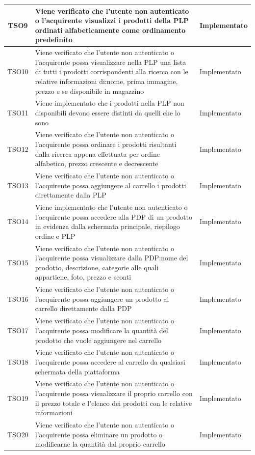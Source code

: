 \begin{longtable}{|c| C{10cm} |C{3cm}|}
	TSO9 & Viene verificato che l'utente non autenticato o l'acquirente visualizzi i prodotti della PLP ordinati alfabeticamente come ordinamento predefinito & Implementato\\ \hline
	TSO10 & Viene verificato che l'utente non autenticato o l'acquirente possa visualizzare nella PLP una lista di tutti i prodotti corrispondenti alla ricerca con le relative informazioni di:nome, prima immagine, prezzo e se disponibile in magazzino & Implementato \\ \hline
	TSO11 & Viene implementato che i prodotti nella PLP non disponibili devono essere distinti da quelli che lo sono & Implementato \\ \hline
	TSO12 & Viene verificato che l'utente non autenticato o l'acquirente possa ordinare i prodotti risultanti dalla ricerca appena effettuata per ordine alfabetico, prezzo crescente e decrescente & Implementato \\ \hline
	TSO13 & Viene verificato che l'utente non autenticato o l'acquirente possa aggiungere al carrello i prodotti direttamente dalla PLP & Implementato\\ \hline
	TSO14 & Viene implementato che l'utente non autenticato o l'acquirente possa accedere alla PDP di un prodotto in evidenza dalla schermata principale, riepilogo ordine e PLP & Implementato \\ \hline
	TSO15 & Viene verificato che l'utente non autenticato o l'acquirente possa visualizzare dalla PDP:nome del prodotto, descrizione, categorie alle quali appartiene, foto, prezzo e sconti & Implementato \\ \hline
	TSO16 & Viene verificato che l'utente non autenticato o l'acquirente possa aggiungere un prodotto al carrello direttamente dalla PDP  & Implementato\\ \hline
	TSO17 & Viene verificato che l'utente non autenticato o l'acquirente possa modificare la quantità del prodotto che vuole aggiungere nel carrello & Implementato\\ \hline
	TSO18 & Viene verificato che l'utente non autenticato o l'acquirente possa accedere al carrello da qualsiasi schermata della piattaforma & Implementato \\ \hline
     TSO19 & Viene verificato che l'utente non autenticato o l'acquirente possa visualizzare il proprio carrello con il prezzo totale e l'elenco dei prodotti con le relative informazioni & Implementato\\ \hline
   	TSO20 & Viene verificato che l'utente non autenticato o l'acquirente possa eliminare un prodotto o modificarne la quantità dal proprio carrello & Implementato\\ \hline

\end{longtable}
